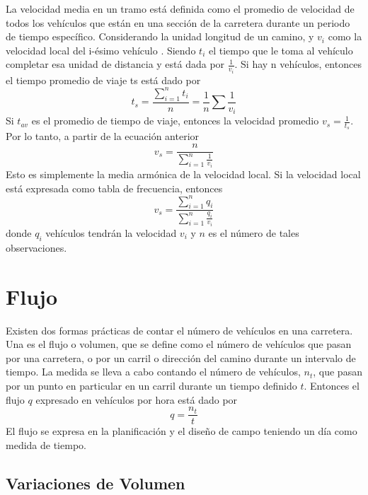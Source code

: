 La velocidad media en un tramo está definida como el promedio de velocidad de todos los vehículos que están en una sección de la carretera durante un periodo de tiempo específico. Considerando la unidad longitud de un camino, y $v_{i}$ como la velocidad local del i-ésimo vehículo . Siendo $t_{i}$ el tiempo que le toma al vehículo completar esa unidad de distancia y está dada por $\frac { 1 }{ { v }_{ i } }$. Si hay n vehículos, entonces el tiempo promedio de viaje ts está dado por
\begin{equation}
{ t }_{ s }=\frac { \sum _{ i=1 }^{ n }{ { t }_{ i } }  }{ n } =\frac { 1 }{ n } \sum { \frac { 1 }{ { v }_{ i } }  }
\end{equation}
Si $t_{av}$ es el promedio de tiempo de viaje, entonces la velocidad promedio ${ v }_{ s }=\frac { 1 }{ { t }_{ s } }$. Por lo tanto, a partir de la ecuación anterior
\begin{equation}
{ v }_{ s }=\frac { n }{ \sum _{ i=1 }^{ n }{ \frac { 1 }{ { v }_{ i } }  }  }
\end{equation}
Esto es simplemente la media armónica de la velocidad local. Si la velocidad local está expresada como tabla de frecuencia, entonces
\begin{equation}
{ v }_{ s }=\frac { \sum _{ i=1 }^{ n }{ { q }_{ i } }  }{ \sum _{ i=1 }^{ n }{ \frac { { q }_{ i } }{ { v }_{ i } }  }  } 
\end{equation}
donde $q_{i}$ vehículos tendrán la velocidad $v_{i}$ y $n$ es el número de tales observaciones.

\section{Flujo}

Existen dos formas prácticas de contar el número de vehículos en una carretera. Una es el flujo o volumen, que se define como el número de vehículos que pasan por una carretera, o por un carril o dirección del camino durante un intervalo de tiempo. La medida se lleva a cabo contando el número de vehículos, $n_{t}$, que pasan por un punto en particular en un carril durante un tiempo definido $t$. Entonces el flujo $q$ expresado en vehículos por hora está dado por
\begin{equation}
q=\frac { { n }_{ t } }{ t }
\end{equation}
El flujo se expresa en la planificación y el diseño de campo teniendo un día como medida de tiempo.

\subsection{Variaciones de Volumen}

